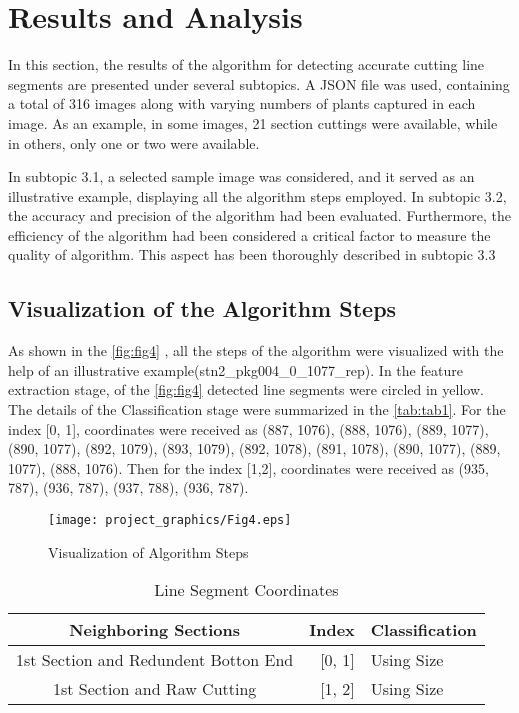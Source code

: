 \documentclass[]{iat}
\begin{document}
\chapter{Results and Analysis}

In this section, the results of the algorithm for detecting accurate cutting line segments are presented under several subtopics. A JSON file was used, containing a total of 316 images along with varying numbers of plants captured in each image. As an example, in some images, 21 section cuttings were available, while in others, only one or two were available. 
\par
In subtopic 3.1, a selected sample image was considered, and it served as an illustrative example, displaying all the algorithm steps employed. In subtopic 3.2, the accuracy and precision of the algorithm had been evaluated. Furthermore, the efficiency of the algorithm had been considered a critical factor to measure the quality of algorithm. This aspect has been thoroughly described in subtopic 3.3
\par

\section{Visualization of the Algorithm Steps}

As shown in the \autoref{fig:fig4} , all the steps of the algorithm were visualized with the help of an illustrative example(stn2\_pkg004\_0\_1077\_rep). In the feature extraction stage, of the \autoref{fig:fig4} detected line segments were circled in yellow. The details of the  Classification stage were summarized in the \autoref{tab:tab1}. For the index [0, 1], coordinates were received as (887, 1076), (888, 1076), (889, 1077), (890, 1077), (892, 1079), (893, 1079), (892, 1078), (891, 1078), (890, 1077), (889, 1077), (888, 1076). Then for the index [1,2], coordinates were received as (935, 787), (936, 787), (937, 788), (936, 787). 

\par
\FloatBarrier
\clearpage
\begin{figure}[h]
    
	\texttt{[image: project\_graphics/Fig4.eps]}
	\caption{Visualization of Algorithm Steps}
	\label{fig:fig4}
\end{figure}

\FloatBarrier
\begin{table}[h]
\begin{tabular}{crl}
\hline
Neighboring Sections & Index & Classification\\\hline
1st Section and Redundent Botton End & [0, 1] & Using Size \\
1st Section and Raw Cutting & [1, 2] & Using Size \\\hline
\end{tabular}
\caption{Line Segment Coordinates}
\label{tab:tab1}
\end{table}
\end{document}
